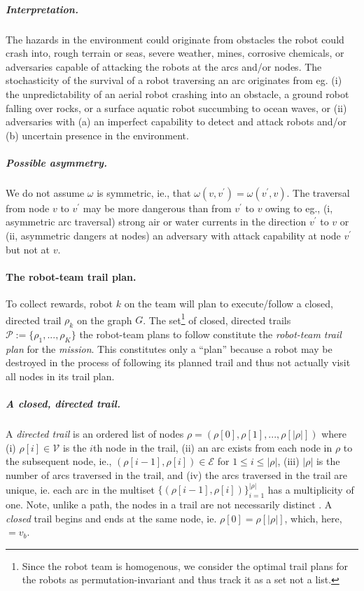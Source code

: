 \documentclass[11pt, oneside]{article}
\begin{document}
\vspace{-\baselineskip}
\subparagraph{Interpretation.} The hazards in the environment could originate from obstacles the robot could crash into, rough terrain or seas, severe weather, mines, corrosive chemicals, or adversaries capable of attacking the robots at the arcs and/or nodes.
The stochasticity of the survival of a robot traversing an arc originates from eg. (i) the unpredictability of an aerial robot crashing into an obstacle, a ground robot falling over rocks, or a surface aquatic robot succumbing to ocean waves, or (ii) adversaries with (a) an imperfect capability to detect and attack robots and/or (b) uncertain presence in the environment.

\vspace{-\baselineskip}
\subparagraph{Possible asymmetry.} We do not assume $\omega$ is symmetric, ie., that $\omega(v, v^\prime) = \omega(v^\prime, v)$. The traversal from node $v$ to $v^\prime$ may be more dangerous than from $v^\prime$ to $v$ owing to eg., (i, asymmetric arc traversal) strong air or water currents in the direction $v^\prime$ to $v$ or (ii, asymmetric dangers at nodes) an adversary with attack capability at node $v^\prime$ but not at $v$. %

\paragraph{The robot-team trail plan.}
To collect rewards, robot $k$ on the team will plan to execute/follow a closed, directed trail $\rho_k$ on the graph $G$.  
The set\footnote{Since the robot team is homogenous, we consider the optimal trail plans for the robots as permutation-invariant and thus track it as a set not a list.} of closed, directed trails $\mathcal{P}:=\{\rho_1, ..., \rho_K\}$ the robot-team plans to follow constitute the \emph{robot-team trail plan} for the \emph{mission}. 
This constitutes only a ``plan'' because a robot may be destroyed in the process of following its planned trail and thus not actually visit all nodes in its trail plan.

\vspace{-\baselineskip}
\subparagraph{A closed, directed trail.} 
A \emph{directed trail} is an ordered list of nodes $\rho = (\rho[0], \rho[1], ..., \rho[\lvert \rho \rvert])$ where
(i) $\rho[i] \in \mathcal{V}$ is the $i$th node in the trail,  
(ii) an arc exists from each node in $\rho$ to the subsequent node, ie., $(\rho[i-1], \rho[i])\in\mathcal{E}$ for $1 \leq i  \leq \lvert \rho \rvert$,
(iii) $\lvert \rho \rvert$ is the number of arcs traversed in the trail,
and
(iv) the arcs traversed in the trail are unique, ie. each arc in the multiset $\{(\rho[i-1], \rho[i])\}_{i=1}^{\lvert \rho \rvert}$ has a multiplicity of one.
Note, unlike a path, the nodes in a trail are not necessarily distinct \cite{wilson1979introduction}.
A \emph{closed} trail begins and ends at the same node, ie. $\rho [0]=\rho[\lvert \rho \rvert]$, which, here, $=v_b$.
\end{document}
